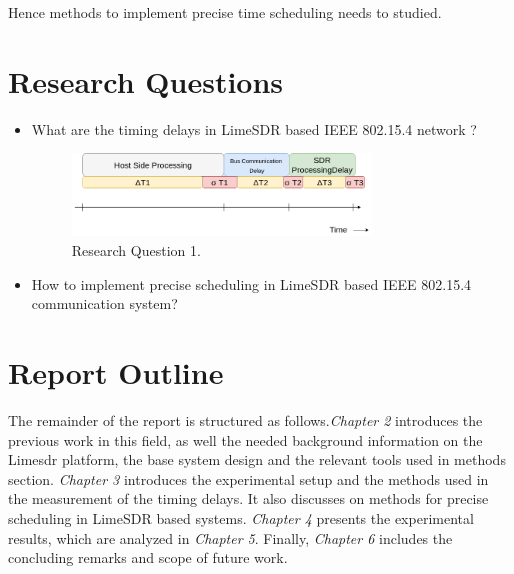 Hence methods to implement precise time scheduling needs to studied.

\section{Research Questions}
\begin{itemize}
\item{ What are the timing delays in  LimeSDR based IEEE 802.15.4 network ?}
\begin{figure}[!h]
\centering
\includegraphics[width=0.75\textwidth]{Figure/RQ1.png}
\caption{Research Question 1.}
\label{rq1}
\end{figure}
\item{ How to implement precise scheduling in LimeSDR based IEEE 802.15.4 communication system? }
\end{itemize}

\section{Report Outline}
The remainder of the report is structured as follows.\textit{Chapter 2} introduces the previous work in this field, as well the needed background information on the Lime\ac{sdr} platform, the base system design and the relevant tools used in methods section. \textit{Chapter 3} introduces the experimental setup and the methods used in the measurement of the timing delays. It also discusses on methods for precise scheduling in LimeSDR based systems. \textit{Chapter 4} presents the experimental results, which are analyzed in \textit{Chapter 5}. Finally, \textit{Chapter 6} includes the concluding remarks and scope of future work.
